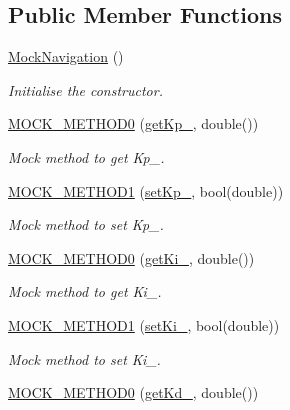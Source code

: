 \subsection*{Public Member Functions}
\begin{DoxyCompactItemize}
\item 
\hyperlink{class_mock_navigation_a54759f67f52b03841f44efe7926fff22}{Mock\+Navigation} ()
\begin{DoxyCompactList}\small\item\em Initialise the constructor. \end{DoxyCompactList}\item 
\hyperlink{class_mock_navigation_acd53221a46f65f159ad53d22d3db1c51}{M\+O\+C\+K\+\_\+\+M\+E\+T\+H\+O\+D0} (\hyperlink{class_navigation_ab1469d74f4838a9d32a8647d22701f9f}{get\+Kp\+\_\+}, double())
\begin{DoxyCompactList}\small\item\em Mock method to get Kp\+\_\+. \end{DoxyCompactList}\item 
\hyperlink{class_mock_navigation_af40d1b1fb60d8bfe8a53ab5d91109b63}{M\+O\+C\+K\+\_\+\+M\+E\+T\+H\+O\+D1} (\hyperlink{class_navigation_a6dd95f46ff4ecc69895452a1879c30af}{set\+Kp\+\_\+}, bool(double))
\begin{DoxyCompactList}\small\item\em Mock method to set Kp\+\_\+. \end{DoxyCompactList}\item 
\hyperlink{class_mock_navigation_aa8fa53a73e8d9774d41fea23d7ecdb63}{M\+O\+C\+K\+\_\+\+M\+E\+T\+H\+O\+D0} (\hyperlink{class_navigation_a1a84392d6cce3f60df452ab482b5647c}{get\+Ki\+\_\+}, double())
\begin{DoxyCompactList}\small\item\em Mock method to get Ki\+\_\+. \end{DoxyCompactList}\item 
\hyperlink{class_mock_navigation_aa7670f64f701f2f174b991362ea11081}{M\+O\+C\+K\+\_\+\+M\+E\+T\+H\+O\+D1} (\hyperlink{class_navigation_a539d10206ceb162171e39c36e8aa8f0f}{set\+Ki\+\_\+}, bool(double))
\begin{DoxyCompactList}\small\item\em Mock method to set Ki\+\_\+. \end{DoxyCompactList}\item 
\hyperlink{class_mock_navigation_adc8e4d41452d78b00729b9327c635ea1}{M\+O\+C\+K\+\_\+\+M\+E\+T\+H\+O\+D0} (\hyperlink{class_navigation_ac6441bb601483166ef7a8081b76f634d}{get\+Kd\+\_\+}, double())

\end{DoxyCompactItemize}
